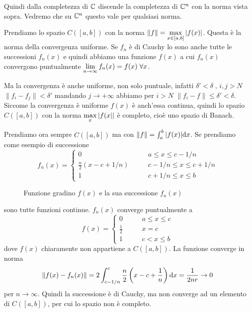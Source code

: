 Quindi dalla completezza di $\mathbb C$ discende la completezza di $\mathbb C^n$ con
la norma vista sopra. Vedremo che su $\mathbb C^n$ questo vale per qualsiasi norma.
\begin{example}
Prendiamo lo spazio $C([a, b])$ con la norma 
$\|f\| = \displaystyle \max_{x \in [a, b]} {\left|f(x)\right|}$.
Questa è la norma della convergenza uniforme. Se $f_n$ è di Cauchy lo sono
anche tutte le successioni $f_n(x)$ e quindi abbiamo una funzione $f(x)$ a
cui $f_n(x)$ convergono puntualmente $\displaystyle \lim_{n \to \infty} f_n(x) = f(x)\;
\forall x$.

Ma la convergenza è anche uniforme, non solo puntuale, infatti 
$\delta' < \delta \;$, $i,j>N$ $\|f_i-f_j\|<\delta'$ mandando $j \to + \infty$
abbiamo per $i>N$ $\|f_i-f\|\leq \delta'<\delta$. Siccome la convergenza è
uniforme $f(x)$ è anch'essa continua, quindi lo spazio $C([a,b])$ con
la norma $\displaystyle \max_{x}{\left|f(x\right|}|$ è completo, cioè uno spazio di Banach.
\end{example}
\begin{example}
	
Prendiamo ora sempre $C([a, b])$ ma con $\|f\| = \int_{a}^b {\left|f(x)\right|} \mathrm{d} x$.
Se prendiamo come esempio di successione
\[
f_n(x)=\begin{cases}
0 \qquad &a \leq x \leq c - 1/n\\
\frac{n}{2}(x - c + 1/n) \qquad &c - 1/n \leq x \leq c + 1/n\\
1 \qquad &c + 1/n \leq x \leq b
\end{cases}
\]
\begin{figure}[!htb]
	\centering 
		\def\svgwidth{\columnwidth}
		\resizebox{10cm}{6cm}{}
	\caption{Funzione gradino $f(x)$ e la sua successione $f_n(x)$
	\label{2nrm_stepf}}
\end{figure}
sono tutte funzioni continue. $f_n(x)$ converge puntualmente a
\[
f(x) = \begin{cases}
0 \qquad &a \leq x \leq c\\
\frac{1}{2} \qquad &x = c\\
1 \qquad &c < x \leq b
\end{cases}
\]
dove $f(x)$ chiaramente non appartiene a $C([a, b])$. La funzione converge in norma
\[
\|f(x) - f_n(x)\| = 2\int_{c - 1/n}^c \frac{n}{2} \left(x - c + \frac{1}{n}\right)
\mathrm{d} x = \frac{1}{2nr} \to 0
\]
per $n \to \infty$. Quindi la successione è di Cauchy, ma non converge ad un elemento di
$C([a, b])$, per cui lo spazio non è completo.
\end{example}

